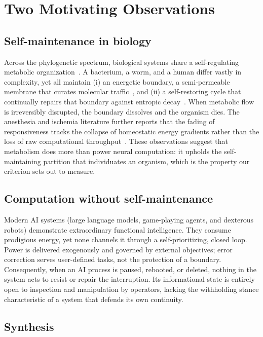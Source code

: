 \documentclass[11pt]{article}
\begin{document}
\section{Two Motivating Observations}
\label{sec:clues}

\subsection{Self-maintenance in biology}

Across the phylogenetic spectrum, biological systems share a self-regulating metabolic organization~\cite{ganti2003principles}. A bacterium, a worm, and a human differ vastly in complexity, yet all maintain (i) an energetic boundary, a semi-permeable membrane that curates molecular traffic~\cite{ganti2003principles}, and (ii) a self-restoring cycle that continually repairs that boundary against entropic decay~\cite{maturana1980autopoiesis}. When metabolic flow is irreversibly disrupted, the boundary dissolves and the organism dies. The anesthesia and ischemia literature further reports that the fading of responsiveness tracks the collapse of homeostatic energy gradients rather than the loss of raw computational throughput~\cite{alkire2008consciousness}. These observations suggest that metabolism does more than power neural computation: it upholds the self-maintaining partition that individuates an organism, which is the property our criterion sets out to measure.

\subsection{Computation without self-maintenance}

Modern AI systems (large language models, game-playing agents, and dexterous robots) demonstrate extraordinary functional intelligence. They consume prodigious energy, yet none channels it through a self-prioritizing, closed loop. Power is delivered exogenously and governed by external objectives; error correction serves user-defined tasks, not the protection of a boundary. Consequently, when an AI process is paused, rebooted, or deleted, nothing in the system acts to resist or repair the interruption. Its informational state is entirely open to inspection and manipulation by operators, lacking the withholding stance characteristic of a system that defends its own continuity.

\subsection{Synthesis}
\end{document}

